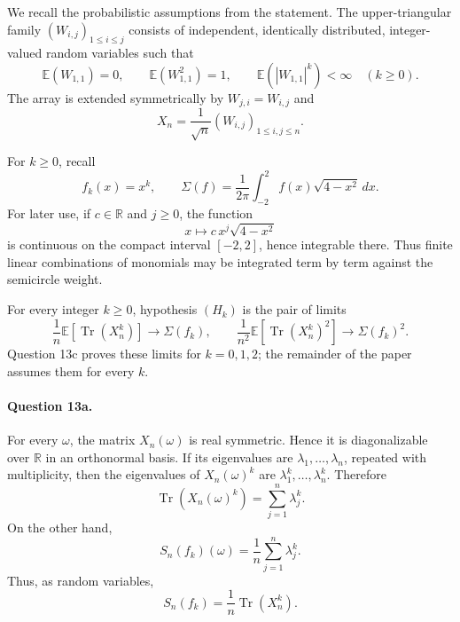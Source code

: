 \documentclass[11pt,a4paper]{article}
\newcommand{\R}{\mathbb{R}}
\newcommand{\E}{\mathbb{E}}
\DeclareMathOperator{\Tr}{Tr}
\begin{document}
We recall the probabilistic assumptions from the statement.  The
upper-triangular family $(W_{i,j})_{1\le i\le j}$ consists of independent,
identically distributed, integer-valued random variables such that
\[
  \E(W_{1,1})=0,
  \qquad
  \E(W_{1,1}^2)=1,
  \qquad
  \E(|W_{1,1}|^k)<\infty\quad(k\ge0).
\]
The array is extended symmetrically by $W_{j,i}=W_{i,j}$ and
\[
  X_n=\frac1{\sqrt n}(W_{i,j})_{1\le i,j\le n}.
\]

For $k\ge0$, recall
\[
  f_k(x)=x^k,
  \qquad
  \Sigma(f)=\frac1{2\pi}\int_{-2}^2 f(x)\sqrt{4-x^2}\,dx.
\]
For later use, if $c\in\R$ and $j\ge0$, the function
\[
  x\longmapsto c\,x^j\sqrt{4-x^2}
\]
is continuous on the compact interval $[-2,2]$, hence integrable there.  Thus
finite linear combinations of monomials may be integrated term by term against
the semicircle weight.

For every integer $k\ge0$, hypothesis $(H_k)$ is the pair of limits
\[
  \boxed{
  \frac1n\E\!\left[\Tr(X_n^k)\right]\longrightarrow\Sigma(f_k),
  \qquad
  \frac1{n^2}\E\!\left[\Tr(X_n^k)^2\right]\longrightarrow\Sigma(f_k)^2.}
\]
Question 13c proves these limits for $k=0,1,2$; the remainder of the paper
assumes them for every $k$.

\paragraph{Question 13a.}
For every $\omega$, the matrix $X_n(\omega)$ is real symmetric.  Hence it is diagonalizable over $\R$ in an orthonormal basis.  If its eigenvalues are $\lambda_1,\dots,\lambda_n$, repeated with multiplicity, then the eigenvalues of $X_n(\omega)^k$ are $\lambda_1^k,\dots,\lambda_n^k$.  Therefore
\[
  \Tr(X_n(\omega)^k)=\sum_{j=1}^n\lambda_j^k.
\]
On the other hand,
\[
  S_n(f_k)(\omega)=\frac1n\sum_{j=1}^n\lambda_j^k.
\]
Thus, as random variables,
\[
  \boxed{S_n(f_k)=\frac1n\Tr(X_n^k).}
\]
\end{document}
